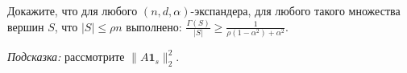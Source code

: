 Докажите, что для любого $(n, d, \alpha)$-экспандера, для любого такого множества вершин $S$, что
$|S| \le \rho n$ выполнено: $\frac{\Gamma(S)}{|S|} \ge
\frac{1}{\rho(1 - \alpha^2) + \alpha^2}$.

\textit{Подсказка:} рассмотрите $\| A \mathbf{1}_s \|_2^2$.
